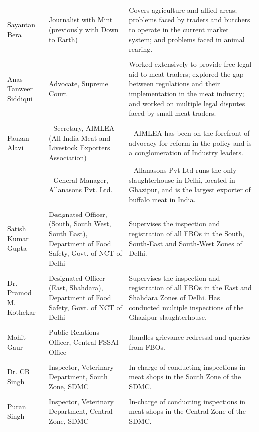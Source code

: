 \documentclass[a4paper, 12pt]{article}
\begin{document}
\begin{longtable}{>{\raggedright}p{2cm}>{\raggedright}p{5cm}>{\raggedright\arraybackslash}p{7.5cm}}
    Sayantan Bera & Journalist with Mint (previously with Down to Earth) & Covers agriculture and allied areas; problems faced by traders and butchers to operate in the current market system; and problems faced in animal rearing. \\
& & \\
    Anas Tanweer Siddiqui & Advocate, Supreme Court  & Worked extensively to provide free legal aid to meat traders; explored the gap between regulations and their implementation in the meat industry; and worked on multiple legal disputes faced by small meat traders. \\
& & \\
    Fauzan Alavi & - Secretary, AIMLEA (All India Meat and Livestock Exporters Association) & - AIMLEA has been on the forefront of advocacy for reform in the policy and is a conglomeration of Industry leaders. \\
    \multicolumn{1}{r}{} & - General Manager, Allanasons Pvt. Ltd. & - Allanasons Pvt Ltd runs the only slaughterhouse in Delhi, located in Ghazipur, and is the largest exporter of buffalo meat in India. \\
& & \\
    Satish Kumar Gupta & Designated Officer, (South, South West, South East), Department of Food Safety, Govt. of NCT of Delhi & Supervises the inspection and registration of all FBOs in the South, South-East and South-West Zones of Delhi. \\
& & \\
    Dr. Pramod M. Kothekar & Designated Officer (East, Shahdara), Department of Food Safety, Govt. of NCT of Delhi & Supervises the inspection and registration of all FBOs in the East and Shahdara Zones of Delhi. Has conducted multiple inspections of the Ghazipur slaughterhouse. \\
& & \\
    Mohit Gaur & Public Relations Officer, Central FSSAI Office & Handles grievance redressal and queries from FBOs.  \\
   & & \\
    Dr. CB Singh & Inspector, Veterinary Department, South Zone, SDMC & In-charge of conducting inspections in meat shops in the South Zone of the SDMC. \\
& & \\
    Puran Singh & Inspector, Veterinary Department, Central Zone, SDMC & In-charge of conducting inspections in meat shops in the Central Zone of the SDMC. \\
\hline
    \end{longtable}%
\end{document}
